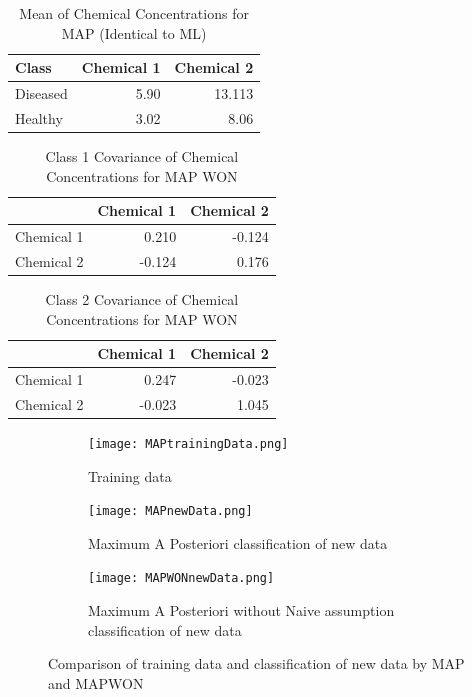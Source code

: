 {{\begin{table}[h]
	\centering
	\caption{Mean of Chemical Concentrations for MAP (Identical to ML)}
	\label{t:ML}
	\begin{tabular}{lrr}
		\hline
		\textbf{Class} & \textbf{Chemical 1} & \textbf{Chemical 2} \\ \hline
		Diseased & 5.90 & 13.113 \\
		Healthy & 3.02 & 8.06  \\
	\end{tabular}
\end{table}

\begin{table}[h]
	\centering
	\caption{Class 1 Covariance of Chemical Concentrations for MAP WON}
	\label{t:ML}
	\begin{tabular}{lrr}
		\hline
		\textbf{} & \textbf{Chemical 1} & \textbf{Chemical 2} \\ \hline
		Chemical 1 & 0.210 & -0.124 \\
		Chemical 2 & -0.124 & 0.176  \\
	\end{tabular}
\end{table}

\begin{table}[h]
	\centering
	\caption{Class 2 Covariance of Chemical Concentrations for MAP WON}
	\label{t:ML}
	\begin{tabular}{lrr}
		\hline
		\textbf{} & \textbf{Chemical 1} & \textbf{Chemical 2} \\ \hline
		Chemical 1 & 0.247 & -0.023 \\
		Chemical 2 & -0.023 & 1.045  \\
	\end{tabular}
\end{table}

\begin{figure}[h!] 
	\centering
	\begin{subfigure}[b]{.49\textwidth}
		\texttt{[image: MAPtrainingData.png]}
		\caption{Training data}
		\label{fig:modelNoReg0}
	\end{subfigure}
	\begin{subfigure}[b]{.49\textwidth}
		\texttt{[image: MAPnewData.png]}
		\caption{Maximum A Posteriori classification of new data}
		\label{fig:modelNoReg1}
	\end{subfigure}
	\begin{subfigure}[b]{.49\textwidth}
		\texttt{[image: MAPWONnewData.png]}
		\caption{Maximum A Posteriori without Naive assumption classification of new data}
		\label{fig:modelNoReg1}
	\end{subfigure}
	\caption{Comparison of training data and classification of new data by MAP and MAPWON}
	\label{fig:CMAP}
\end{figure}


}}
